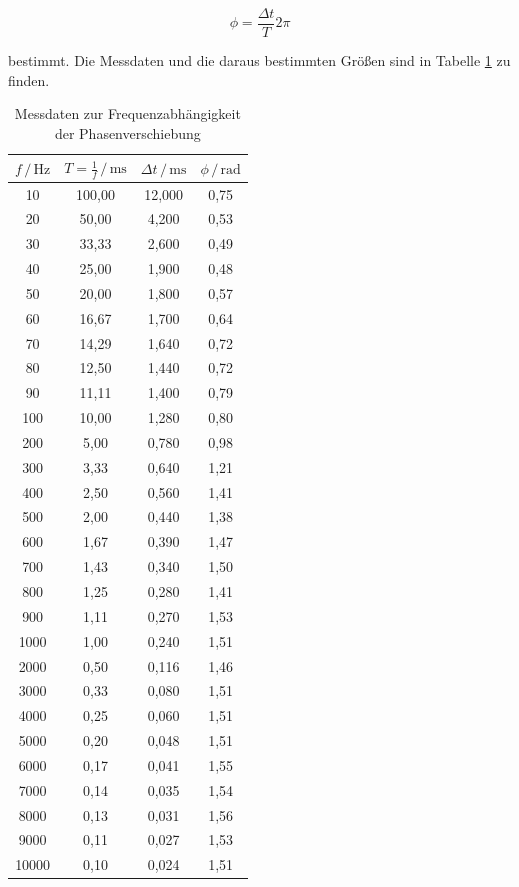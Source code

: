 \begin{equation*}
\phi = \frac{\Delta t}{T} 2 \pi
\end{equation*}

bestimmt. 
Die Messdaten und die daraus bestimmten Größen sind in Tabelle \ref{tab:Messdaten3} zu finden. 

\begin{table}
\centering
\caption{Messdaten zur Frequenzabhängigkeit der Phasenverschiebung}
\label{tab:Messdaten3}
\begin{tabular}{c c c c}
\toprule
$f \,/\, \si{\hertz}$ & $T=\frac{1}{f} \,/\, \si{\milli\second}$ 
&$\Delta t \,/\, \si{\milli\second}$ & $\phi \,/\, \si{\radian}$\\
\midrule
   10 & 100,00 & 12,000 & 0,75\\
   20 &  50,00 &  4,200 & 0,53\\
   30 &  33,33 &  2,600 & 0,49\\
   40 &  25,00 &  1,900 & 0,48\\
   50 &  20,00 &  1,800 & 0,57\\
   60 &  16,67 &  1,700 & 0,64\\
   70 &  14,29 &  1,640 & 0,72\\
   80 &  12,50 &  1,440 & 0,72\\
   90 &  11,11 &  1,400 & 0,79\\
  100 &  10,00 &  1,280 & 0,80\\
  200 &   5,00 &  0,780 & 0,98\\
  300 &   3,33 &  0,640 & 1,21\\
  400 &   2,50 &  0,560 & 1,41\\
  500 &   2,00 &  0,440 & 1,38\\
  600 &   1,67 &  0,390 & 1,47\\
  700 &   1,43 &  0,340 & 1,50\\
  800 &   1,25 &  0,280 & 1,41\\
  900 &   1,11 &  0,270 & 1,53\\
 1000 &   1,00 &  0,240 & 1,51\\
 2000 &   0,50 &  0,116 & 1,46\\
 3000 &   0,33 &  0,080 & 1,51\\
 4000 &   0,25 &  0,060 & 1,51\\
 5000 &   0,20 &  0,048 & 1,51\\
 6000 &   0,17 &  0,041 & 1,55\\
 7000 &   0,14 &  0,035 & 1,54\\
 8000 &   0,13 &  0,031 & 1,56\\
 9000 &   0,11 &  0,027 & 1,53\\
10000 &   0,10 &  0,024 & 1,51\\
\bottomrule
\end{tabular}
\end{table} 


